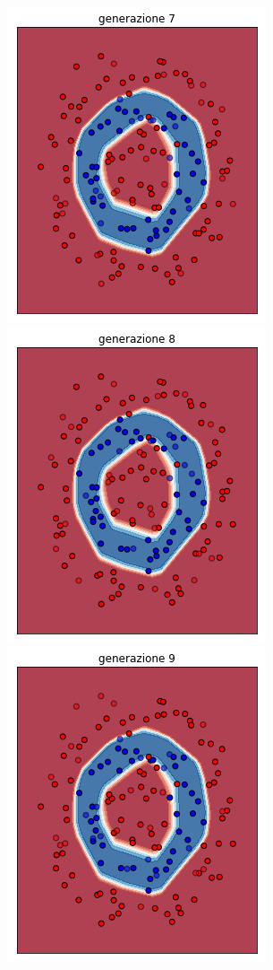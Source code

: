 \documentclass[12pt,a4paper]{report}
\begin{document}
\begin{figure}[H]
 \includegraphics[scale = 0.37]{images/circle+-rnd-log./7}
 \includegraphics[scale = 0.37]{images/circle+-rnd-log./8}
 \\
 \includegraphics[scale = 0.37]{images/circle+-rnd-log./9}

\end{figure}
\end{document}
